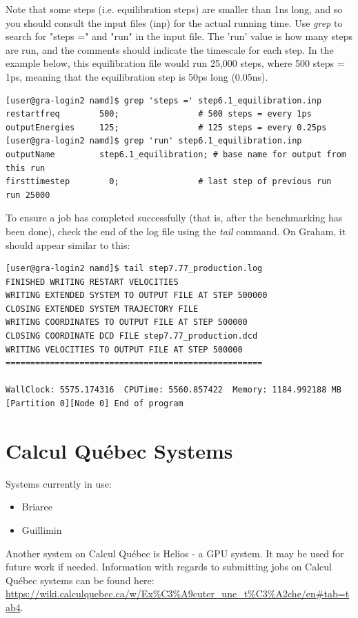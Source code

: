 \documentclass[12pt]{article}
\begin{document}
\quad Note that some steps (i.e. equilibration steps) are smaller than 1ns long, and so you should consult the input files (inp) for the actual running time. Use \textit{grep} to search for "steps =" and "run" in the input file. The 'run' value is how many steps are run, and the comments should indicate the timescale for each step. In the example below, this equilibration file would run 25,000 steps, where 500 steps = 1ps, meaning that the equilibration step is 50ps long (0.05ns).
\begin{lstlisting}[numbers=none]
[user@gra-login2 namd]$ grep 'steps =' step6.1_equilibration.inp 
restartfreq        500;                # 500 steps = every 1ps
outputEnergies     125;                # 125 steps = every 0.25ps
[user@gra-login2 namd]$ grep 'run' step6.1_equilibration.inp 
outputName         step6.1_equilibration; # base name for output from this run
firsttimestep        0;                # last step of previous run
run 25000
\end{lstlisting}


\quad To ensure a job has completed successfully (that is, after the benchmarking has been done), check the end of the log file using the \textit{tail} command. On Graham, it should appear similar to this:

\begin{lstlisting}[numbers=none]
[user@gra-login2 namd]$ tail step7.77_production.log 
FINISHED WRITING RESTART VELOCITIES
WRITING EXTENDED SYSTEM TO OUTPUT FILE AT STEP 500000
CLOSING EXTENDED SYSTEM TRAJECTORY FILE
WRITING COORDINATES TO OUTPUT FILE AT STEP 500000
CLOSING COORDINATE DCD FILE step7.77_production.dcd
WRITING VELOCITIES TO OUTPUT FILE AT STEP 500000
====================================================

WallClock: 5575.174316  CPUTime: 5560.857422  Memory: 1184.992188 MB
[Partition 0][Node 0] End of program
\end{lstlisting} 

\newpage

\section{Calcul Qu\'{e}bec Systems}\label{CalcQ}

\quad Systems currently in use:
\begin{itemize}
\item Briaree
\item Guillimin
\end{itemize}
\quad\enskip\quad Another system on Calcul Qu\'{e}bec is Helios - a GPU system. It may be used for future work if needed. Information with regards to submitting jobs on Calcul Qu\'{e}bec systems can be found here: \url{https://wiki.calculquebec.ca/w/Ex%C3%A9cuter_une_t%C3%A2che/en#tab=tab4}. 
\end{document}
